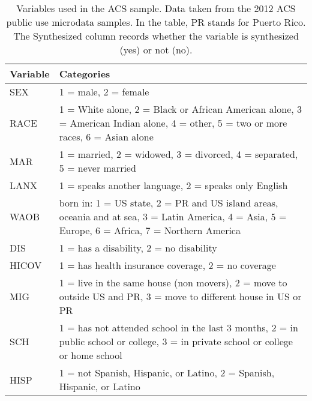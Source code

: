 \documentclass[11pt]{article}
\begin{document}
\begin{table}
\centering
\begin{tabular}{p{0.7in} p{5.5in}}
Variable &  Categories \\ \hline
SEX &  1 = male, 2 = female \\
RACE& 1 = White alone, 2 = Black or African American alone, 3 = American Indian alone, 4 = other,  5 = two or more races, 6 = Asian alone \\
MAR &  1 = married, 2 = widowed, 3 = divorced, 4 = separated, 5 = never married \\
LANX & 1 = speaks another language, 2 = speaks only English \\
WAOB & born in: 1 = US state, 2 = PR and US island areas, oceania and at sea, 3 = Latin America, 4 = Asia,
5 = Europe, 6 = Africa, 7 = Northern America \\
DIS &  1 = has a disability, 2 = no disability \\
HICOV & 1 = has health insurance coverage, 2 = no coverage \\
MIG & 1 = live in the same house (non movers), 2 = move to outside US and PR, 3 = move to different house in US or PR  \\
SCH & 1 = has not attended school in the last 3 months, 2 = in public school or college, 3 = in private school or college or home school \\
HISP & 1 = not Spanish, Hispanic, or Latino, 2 = Spanish, Hispanic, or Latino  \\ \hline
\end{tabular}
\caption{Variables used in the ACS sample. Data taken
  from the 2012 ACS public use microdata
  samples. In the table, PR stands for Puerto Rico. The Synthesized column records whether the variable is synthesized (yes) or not (no).}
\end{table}
\end{document}
